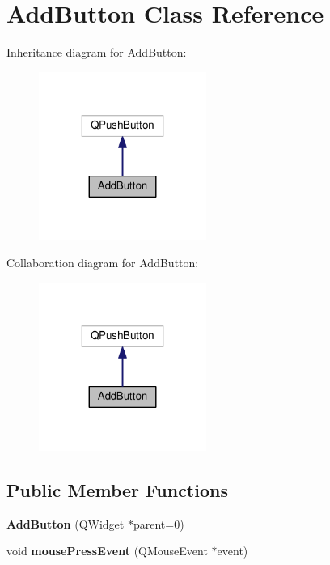 \hypertarget{class_add_button}{}\section{Add\+Button Class Reference}
\label{class_add_button}


Inheritance diagram for Add\+Button\+:
\nopagebreak
\begin{figure}[H]
\begin{center}
\leavevmode
\includegraphics[width=155pt]{class_add_button__inherit__graph}
\end{center}
\end{figure}


Collaboration diagram for Add\+Button\+:
\nopagebreak
\begin{figure}[H]
\begin{center}
\leavevmode
\includegraphics[width=155pt]{class_add_button__coll__graph}
\end{center}
\end{figure}
\subsection*{Public Member Functions}
\begin{DoxyCompactItemize}
\item 
{\bfseries Add\+Button} (Q\+Widget $\ast$parent=0)\hypertarget{class_add_button_a503970bfbab5c9f2d8be45b95f15858e}{}\label{class_add_button_a503970bfbab5c9f2d8be45b95f15858e}

\item 
void {\bfseries mouse\+Press\+Event} (Q\+Mouse\+Event $\ast$event)\hypertarget{class_add_button_ae9cbb131d605755ff68a4d1bd7a47858}{}\label{class_add_button_ae9cbb131d605755ff68a4d1bd7a47858}

\end{DoxyCompactItemize}
